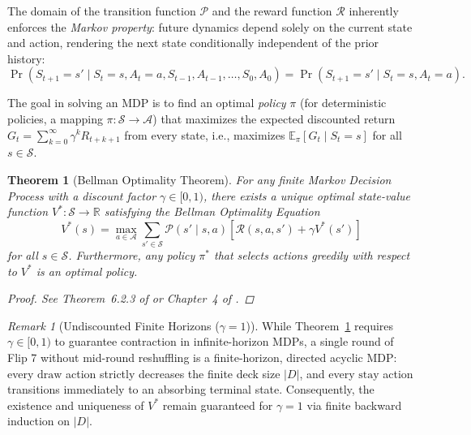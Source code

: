 \documentclass{article}
\theoremstyle{plain}
\newtheorem{theorem}{Theorem}[section]
\theoremstyle{definition}
\theoremstyle{remark}
\newtheorem*{remark}{Remark}
\begin{document}
The domain of the transition function $\mathcal{P}$ and the reward function $\mathcal{R}$ inherently enforces the \textit{Markov property}: future dynamics depend solely on the current state and action, rendering the next state conditionally independent of the prior history:
\[
    \Pr(S_{t+1} = s' \mid S_t = s, A_t = a, S_{t-1}, A_{t-1}, \dots, S_0, A_0) = \Pr(S_{t+1} = s' \mid S_t = s, A_t = a).
\]

The goal in solving an MDP is to find an optimal \textit{policy} $\pi$ (for deterministic policies, a mapping $\pi: \mathcal{S} \to \mathcal{A}$) that maximizes the expected discounted return $G_t = \sum_{k=0}^{\infty} \gamma^k R_{t+k+1}$ from every state, i.e., maximizes $\mathbb{E}_{\pi}[G_t \mid S_t = s]$ for all $s \in \mathcal{S}$.

\begin{theorem}[Bellman Optimality Theorem]\label{thm:bellman}
For any finite Markov Decision Process with a discount factor $\gamma \in [0, 1)$, there exists a unique optimal state-value function $V^* : \mathcal{S} \to \mathbb{R}$ satisfying the Bellman Optimality Equation
\[
    V^*(s) = \max_{a \in \mathcal{A}} \sum_{s' \in \mathcal{S}} \mathcal{P}(s' \mid s, a) \left[ \mathcal{R}(s, a, s') + \gamma V^*(s') \right]
\]
for all $s \in \mathcal{S}$. Furthermore, any policy $\pi^*$ that selects actions greedily with respect to $V^*$ is an optimal policy.
\begin{proof}
See Theorem~6.2.3 of \cite{puterman2014markov} or Chapter~4 of \cite{sutton2018reinforcement}.
\end{proof}
\end{theorem}

\begin{remark}[Undiscounted Finite Horizons ($\gamma = 1$)]
While Theorem~\ref{thm:bellman} requires $\gamma \in [0, 1)$ to guarantee contraction in infinite-horizon MDPs, a single round of Flip 7 without mid-round reshuffling is a finite-horizon, directed acyclic MDP: every $\text{draw}$ action strictly decreases the finite deck size $|D|$, and every $\text{stay}$ action transitions immediately to an absorbing terminal state. Consequently, the existence and uniqueness of $V^*$ remain guaranteed for $\gamma = 1$ via finite backward induction on $|D|$.
\end{remark}
\end{document}
